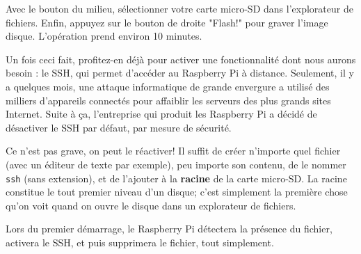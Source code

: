 Avec le bouton du milieu, sélectionner votre carte micro-SD dans l'explorateur de fichiers. Enfin, appuyez sur le bouton de droite "Flash!" pour graver l'image disque. L'opération prend environ 10 minutes.

Un fois ceci fait, profitez-en déjà pour activer une fonctionnalité dont nous aurons besoin : le SSH, qui permet d'accéder au Raspberry Pi à distance. Seulement, il y a quelques mois, une attaque informatique de grande envergure a utilisé des milliers d'appareils connectés pour affaiblir les serveurs des plus grands sites Internet. Suite à ça, l'entreprise qui produit les Raspberry Pi a décidé de désactiver le SSH par défaut, par mesure de sécurité.

Ce n'est pas grave, on peut le réactiver! Il suffit de créer n'importe quel fichier (avec un éditeur de texte par exemple), peu importe son contenu, de le nommer \texttt{ssh} (sans extension), et de l'ajouter à la \textbf{racine} de la carte micro-SD. La racine constitue le tout premier niveau d'un disque; c'est simplement la première chose qu'on voit quand on ouvre le disque dans un explorateur de fichiers.

Lors du premier démarrage, le Raspberry Pi détectera la présence du fichier, activera le SSH, et puis supprimera le fichier, tout simplement.